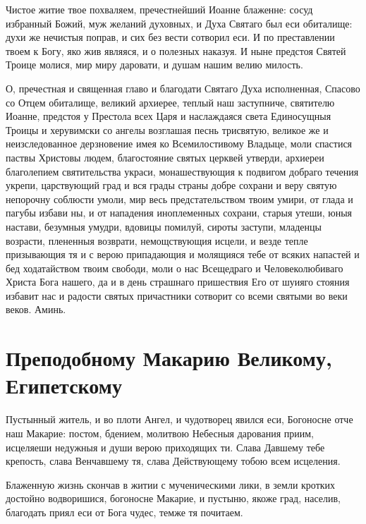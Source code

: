  Чистое житие твое похваляем, пречестнейший Иоанне блаженне: сосуд избранный Божий, муж желаний духовных, и Духа Святаго был еси обиталище: духи же нечистыя поправ, и сих без вести сотворил еси. И по преставлении твоем к Богу, яко жив являяся, и о полезных наказуя. И ныне предстоя Святей Троице молися, мир миру даровати, и душам нашим велию милость.




О, пречестная и священная главо и благодати Святаго Духа исполненная, Спасово со Отцем обиталище, великий архиерее, теплый наш заступниче, святителю Иоанне, предстоя у Престола всех Царя и наслаждаяся света Единосущныя Троицы и херувимски со ангелы возглашая песнь трисвятую, великое же и неизследованное дерзновение имея ко Всемилостивому Владыце, моли спастися паствы Христовы людем, благостояние святых церквей утверди, архиереи благолепием святительства украси, монашествующия к подвигом добраго течения укрепи, царствующий град и вся грады страны добре сохрани и веру святую непорочну соблюсти умоли, мир весь предстательством твоим умири, от глада и пагубы избави ны, и от нападения иноплеменных сохрани, старыя утеши, юныя настави, безумныя умудри, вдовицы помилуй, сироты заступи, младенцы возрасти, плененныя возврати, немощствующия исцели, и везде тепле призывающия тя и с верою припадающия и молящияся тебе от всяких напастей и бед ходатайством твоим свободи, моли о нас Всещедраго и Человеколюбиваго Христа Бога нашего, да и в день страшнаго пришествия Его от шуияго стояния избавит нас и радости святых причастники сотворит со всеми святыми во веки веков. Аминь.


\section{Преподобному Макарию Великому, Египетскому}
 




Пустынный житель, и во плоти Ангел, и чудотворец явился еси, Богоносне отче наш Макарие: постом, бдением, молитвою Небесныя дарования приим, исцеляеши недужныя и души верою приходящих ти. Слава Давшему тебе крепость, слава Венчавшему тя, слава Действующему тобою всем исцеления.




Блаженную жизнь скончав в житии с мученическими лики, в земли кротких достойно водворишися, богоносне Макарие, и пустыню, якоже град, населив, благодать приял еси от Бога чудес, темже тя почитаем.


